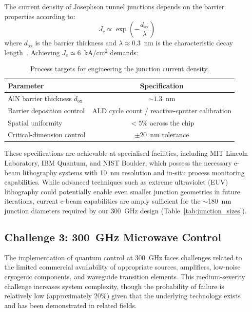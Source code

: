 The current density of Josephson tunnel junctions depends on the barrier properties according to:
\begin{equation}
J_c \propto \exp\left(-\frac{d_{\text{ox}}}{\lambda}\right)
\end{equation}
where $d_{\text{ox}}$ is the barrier thickness and $\lambda \approx 0.3$~nm is the characteristic decay length~\cite{Wang2026ALDNitride}. Achieving $J_c \simeq 6$~kA/cm$^2$ demands:
\begin{table}[h]
\centering
\begin{tabular}{@{}lc@{}}
\toprule
\textbf{Parameter} & \textbf{Specification} \\
\midrule
AlN barrier thickness $d_{\text{ox}}$ & $\sim 1.3$~nm \\
Barrier deposition control      & ALD cycle count / reactive-sputter calibration \\
Spatial uniformity             & $< 5\%$ across the chip \\
Critical-dimension control     & $\pm 20$~nm tolerance \\
\bottomrule
\end{tabular}
\caption{Process targets for engineering the junction current density.}
\label{tab:cd_engineering}
\end{table}

These specifications are achievable at specialised facilities, including MIT Lincoln Laboratory, IBM Quantum, and NIST Boulder, which possess the necessary e-beam lithography systems with 10~nm resolution and in-situ process monitoring capabilities. While advanced techniques such as extreme ultraviolet (EUV) lithography could potentially enable even smaller junction geometries in future iterations, current e-beam capabilities are amply sufficient for the $\sim$180~nm junction diameters required by our 300~GHz design (Table~\ref{tab:junction_sizes}).

\subsection{Challenge 3: 300~GHz Microwave Control}

The implementation of quantum control at 300~GHz faces challenges related to the limited commercial availability of appropriate sources, amplifiers, low-noise cryogenic components, and waveguide transition elements. This medium-severity challenge increases system complexity, though the probability of failure is relatively low (approximately 20\%) given that the underlying technology exists and has been demonstrated in related fields.

